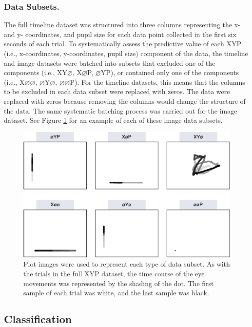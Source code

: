 \documentclass[
  english,
  man,floatsintext]{apa6}
\begin{document}
\subsubsection{Data Subsets.}

The full timeline dataset was structured into three columns representing the x- and y- coordinates, and pupil size for each data point collected in the first six seconds of each trial. To systematically assess the predictive value of each XYP (i.e., x-coordinates, y-coordinates, pupil size) component of the data, the timeline and image datasets were batched into subsets that excluded one of the components (i.e., XY\(\varnothing\), X\(\varnothing\)P, \(\varnothing\)YP), or contained only one of the components (i.e., X\(\varnothing\varnothing\), \(\varnothing\)Y\(\varnothing\), \(\varnothing\varnothing\)P). For the timeline datasets, this means that the columns to be excluded in each data subset were replaced with zeros. The data were replaced with zeros because removing the columns would change the structure of the data. The same systematic batching process was carried out for the image dataset. See Figure \ref{fig:ave-subset} for an example of each of these image data subsets.

\begin{figure}
\centering
\includegraphics{figures/subset_imgs.png}
\caption{\label{fig:ave-subset}Plot images were used to represent each type of data subset. As with the trials in the full XYP dataset, the time course of the eye movements was represented by the shading of the dot. The first sample of each trial was white, and the last sample was black.}
\end{figure}

\subsection{Classification}
\end{document}
